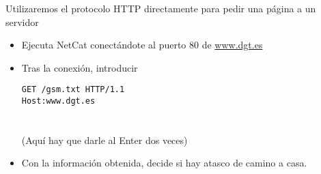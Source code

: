 \begin{homeworkProblem}
  Utilizaremos el protocolo HTTP directamente para pedir una página a un servidor
  \begin{itemize}
  \item Ejecuta NetCat conectándote al puerto 80 de \url{www.dgt.es}
  \item Tras la conexión, introducir
    \begin{cuadrito}
      \texttt{GET /gsm.txt HTTP/1.1} \\
      \texttt{Host:www.dgt.es} \\
      \\
      \\
      (Aquí hay que darle al Enter dos veces)
    \end{cuadrito}
  \item Con la información obtenida, decide si hay atasco de camino a casa.
  \end{itemize}
\end{homeworkProblem}





